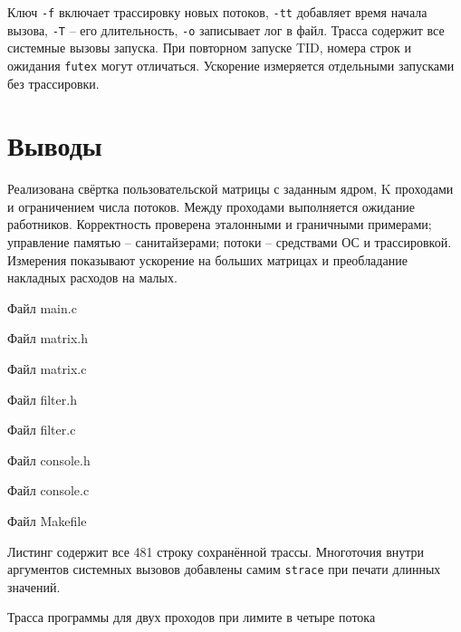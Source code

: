 \documentclass[12pt,a4paper]{article}
\begin{document}
Ключ \texttt{-f} включает трассировку новых потоков, \texttt{-tt} добавляет время начала вызова, \texttt{-T} -- его длительность, \texttt{-o} записывает лог в файл. Трасса содержит все системные вызовы запуска. При повторном запуске TID, номера строк и ожидания \texttt{futex} могут отличаться. Ускорение измеряется отдельными запусками без трассировки.

\section{Выводы}

Реализована свёртка пользовательской матрицы с заданным ядром, K проходами и ограничением числа потоков. Между проходами выполняется ожидание работников. Корректность проверена эталонными и граничными примерами; управление памятью -- санитайзерами; потоки -- средствами ОС и трассировкой. Измерения показывают ускорение на больших матрицах и преобладание накладных расходов на малых.


\begin{listingblock}{Файл main.c}\end{listingblock}

\begin{listingblock}{Файл matrix.h}\end{listingblock}

\begin{listingblock}{Файл matrix.c}\end{listingblock}

\begin{listingblock}{Файл filter.h}\end{listingblock}

\begin{listingblock}{Файл filter.c}\end{listingblock}

\begin{listingblock}{Файл console.h}\end{listingblock}

\begin{listingblock}{Файл console.c}\end{listingblock}

\begin{listingblock}{Файл Makefile}\end{listingblock}

\label{app:full-strace}

Листинг содержит все 481 строку сохранённой трассы. Многоточия внутри аргументов системных вызовов добавлены самим \texttt{strace} при печати длинных значений.

\begin{listingblock}{Трасса программы для двух проходов при лимите в четыре потока}
\end{listingblock}
\end{document}
